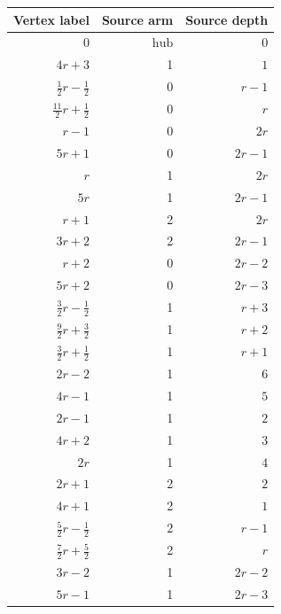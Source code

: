 \begin{longtable}{rrr}
Vertex label & Source arm & Source depth\\\hline\endhead
$0$ & $\mathrm{hub}$ & $0$\\
$4r+3$ & 1 & $1$\\
$\frac{1}{2}r-\frac{1}{2}$ & 0 & $r-1$\\
$\frac{11}{2}r+\frac{1}{2}$ & 0 & $r$\\
$r-1$ & 0 & $2r$\\
$5r+1$ & 0 & $2r-1$\\
$r$ & 1 & $2r$\\
$5r$ & 1 & $2r-1$\\
$r+1$ & 2 & $2r$\\
$3r+2$ & 2 & $2r-1$\\
$r+2$ & 0 & $2r-2$\\
$5r+2$ & 0 & $2r-3$\\
$\frac{3}{2}r-\frac{1}{2}$ & 1 & $r+3$\\
$\frac{9}{2}r+\frac{3}{2}$ & 1 & $r+2$\\
$\frac{3}{2}r+\frac{1}{2}$ & 1 & $r+1$\\
$2r-2$ & 1 & $6$\\
$4r-1$ & 1 & $5$\\
$2r-1$ & 1 & $2$\\
$4r+2$ & 1 & $3$\\
$2r$ & 1 & $4$\\
$2r+1$ & 2 & $2$\\
$4r+1$ & 2 & $1$\\
$\frac{5}{2}r-\frac{1}{2}$ & 2 & $r-1$\\
$\frac{7}{2}r+\frac{5}{2}$ & 2 & $r$\\
$3r-2$ & 1 & $2r-2$\\
$5r-1$ & 1 & $2r-3$\\
\end{longtable}
\endgroup

